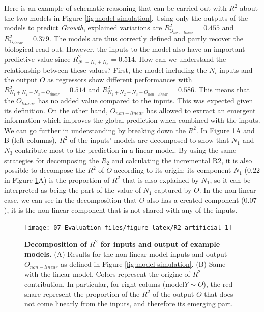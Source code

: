 \documentclass[a4paper,12pt,twoside,onecolumn,openright,final,oldfontcommands]{memoir}
\begin{document}
Here is an example of schematic reasoning that can be carried out with
\(R^2\) about the two models in Figure \ref{fig:model-simulation}. Using
only the outputs of the models to predict \emph{Growth}, explained
variations are \(R^2_{O_{non-linear}}=0.455\) and
\(R^2_{O_{linear}}=0.379\). The models are thus correctly defined and
partly recover the biological read-out. However, the inputs to the model
also have an important predictive value since
\(R^2_{N_1+N_2+N_3}=0.514\). How can we understand the relationship
between these values? First, the model including the \(N_i\) inputs and
the output \(O\) as regressors show different performances with
\(R^2_{N_1+N_2+N_3+O_{linear}}=0.514\) and
\(R^2_{N_1+N_2+N_3+O_{non-linear}}=0.586\). This means that the
\(O_{linear}\) has no added value compared to the inputs. This was
expected given its definition. On the other hand, \(O_{non-linear}\) has
allowed to extract an emergent information which improves the global
prediction when combined with the inputs. We can go further in
understanding by breaking down the \(R^2\). In Figure
\ref{fig:R2-artificial}A and B (left columns), \(R^2\) of the inputs'
models are decomposed to show that \(N_1\) and \(N_3\) contribute most
to the prediction in a linear model. By using the same strategies for
decomposing the \(R_2\) and calculating the incremental R2, it is also
possible to decompose the \(R^2\) of \(O\) according to its origin: its
component \(N_1\) (\(0.22\) in Figure \ref{fig:R2-artificial}A) is the
proportion of \(R^2\) that is also explained by \(N_1\), so it can be
interpreted as being the part of the value of \(N_1\) captured by \(O\).
In the non-linear case, we can see in the decomposition that \(O\) also
has a created component (\(0.07\)), it is the non-linear component that
is not shared with any of the inputs.

\begin{figure}

{\centering \texttt{[image: 07-Evaluation\_files/figure-latex/R2-artificial-1]} 

}

\caption[Decomposition of $R^2$ for inputs and output of example models]{\textbf{Decomposition of \(R^2\) for inputs
and output of example models.} (A) Results for the non-linear model
inputs and output \(O_{non-linear}\) as defined in Figure
\ref{fig:model-simulation}. (B) Same with the linear model. Colors
represent the origine of \(R^2\) contribution. In particular, for right
colums (model\(Y\sim O\)), the red share represent the proportion of the
\(R^2\) of the output \(O\) that does not come linearly from the inputs,
and therefore its emerging part.}\label{fig:R2-artificial}
\end{figure}
\end{document}

